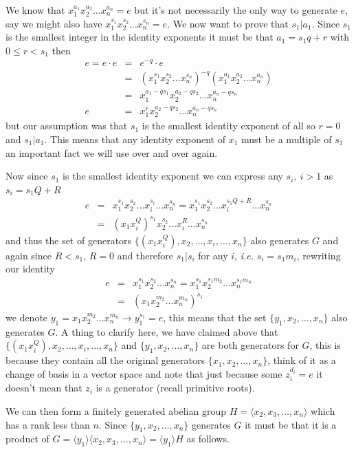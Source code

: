 \documentclass[aps,preprint,preprintnumbers,nofootinbib,showpacs,prd]{revtex4-1}
\newcommand{\ie}{{\it i.e.} }
\newcommand{\nbea}{\begin{eqnarray*}}
\newcommand{\neea}{\end{eqnarray*}}
\begin{document}
We know that $x_1^{a_1} x_2^{a_2} \ldots x_n^{a_n} = e$ but it's not necessarily the only way to generate $e$, say we might also have $x_1^{s_1} x_2^{s_2} \ldots x_n^{s_n} = e$. We now want to prove that $s_1|a_1$. Since $s_1$ is the smallest integer in the identity exponents it must be that $a_1 = s_1q + r$ with $0 \le r < s_1$ then
%
\nbea
e = e \cdot e & = & e^{-q} \cdot e \\
& = & (x_1^{s_1} x_2^{s_2} \ldots x_n^{s_n})^{-q} (x_1^{a_1} x_2^{a_2} \ldots x_n^{a_n}) \\
& = & x_1^{a_1 - qs_1} x_2^{a_2-qs_2} \ldots x_n^{a_n-qs_n} \\
e & = & x_1^{r} x_2^{a_2-qs_2} \ldots x_n^{a_n-qs_n}
\neea
%
but our assumption was that $s_1$ is the smallest identity exponent of all so $r = 0$ and $s_1|a_1$. This means that any identity exponent of $x_1$ must be a multiple of $s_1$ an important fact we will use over and over again.

Now since $s_1$ is the smallest identity exponent we can express any $s_i, ~i > 1$ as $s_i = s_1 Q + R$
%
\nbea
e & = & x_1^{s_1} x_2^{s_2} \ldots x_i^{s_i} \ldots x_n^{s_n} = x_1^{s_1} x_2^{s_2} \ldots x_i^{s_1 Q + R} \ldots x_n^{s_n} \\
& = & (x_1x_i^Q)^{s_1} x_2^{s_2} \ldots x_i^R \dots x_n^{s_n}
\neea
%
and thus the set of generators $\{(x_1x_i^Q), x_2, \ldots, x_i, \ldots, x_n\}$ also generates $G$ and again since $R < s_1$, $R = 0$ and therefore $s_1|s_i$ for any $i$, \ie $s_i = s_1m_i$, rewriting our identity
%
\nbea
e & = & x_1^{s_1} x_2^{s_2} \ldots x_n^{s_n} = x_1^{s_1} x_2^{s_1m_2} \ldots x_n^{s_1m_n} \\
& = & (x_1 x_2^{m_2} \ldots x_n^{m_n})^{s_1}
\neea
%
we denote $y_1 = x_1 x_2^{m_2} \ldots x_n^{m_n} \to y_1^{s_1} = e$, this means that the set $\{y_1, x_2, \dots, x_n\}$ also generates $G$. A thing to clarify here, we have claimed above that $\{(x_1x_i^Q), x_2, \ldots, x_i, \ldots, x_n\}$ and $\{y_1, x_2, \dots, x_n\}$ are both generators for $G$, this is because they contain all the original generators $\{x_1, x_2, \dots, x_n\}$, think of it as a change of basis in a vector space and note that just because some $z_i^{d_i} = e$ it doesn't mean that $z_i$ is a generator (recall primitive roots).

We can then form a finitely generated abelian group $H = \langle x_2, x_3, \ldots, x_n \rangle$ which has a rank less than $n$. Since $\{y_1, x_2, \dots, x_n\}$ generates $G$ it must be that it is a product of $G = \langle y_1 \rangle \langle x_2, x_3, \ldots, x_n \rangle = \langle y_1 \rangle H$ as follows.
\end{document}
